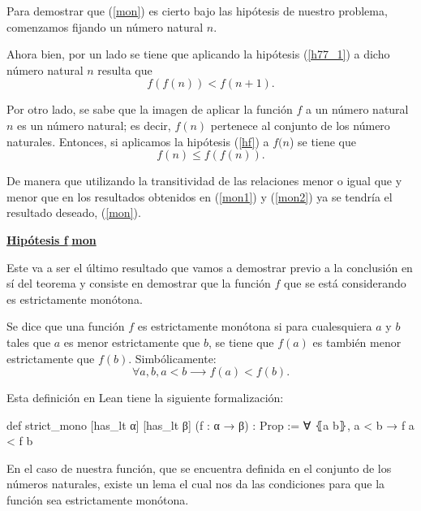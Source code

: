 \begin{demostracion}
  Para demostrar que (\ref{mon}) es cierto bajo las hipótesis de nuestro
  problema, comenzamos fijando un número natural \(n\).

  Ahora bien, por un lado se tiene que aplicando la hipótesis
  (\ref{h77_1}) a dicho número natural \(n\) resulta que
  \begin{equation}\label{mon1}
    f(f(n)) < f(n+1).
  \end{equation}

  Por otro lado, se sabe que la imagen de aplicar la función \(f\) a un
  número natural \(n\) es un número natural; es decir, \(f(n)\)
  pertenece al conjunto de los número naturales. Entonces, si aplicamos
  la hipótesis (\ref{hf}) a \(f(n\)) se tiene que
  \begin{equation}\label{mon2}
    f(n) ≤ f(f(n)).
  \end{equation}

  De manera que utilizando la transitividad de las relaciones menor o
  igual que y menor que en los resultados obtenidos en (\ref{mon1}) y
  (\ref{mon2}) ya se tendría el resultado deseado, (\ref{mon}).

  \noindent
  \textbf{\underline{Hipótesis f\(\_\)mon}}

  Este va a ser el último resultado que vamos a demostrar previo a la
  conclusión en sí del teorema y consiste en demostrar que la función
  \(f\) que se está considerando es estrictamente monótona.

  \begin{definicion}\label{def:mono}
    Se dice que una función \(f\) es estrictamente monótona si para
    cualesquiera \(a\) y \(b\) tales que \(a\) es menor estrictamente
    que \(b\), se tiene que \(f(a)\) es también menor estrictamente que
    \(f(b)\). Simbólicamente:
    \begin{equation}
      ∀a,b, a < b ⟶ f(a) < f(b).
    \end{equation}
  \end{definicion}

  Esta definición en Lean tiene la siguiente formalización:
  \begin{leancode}
    def strict_mono [has_lt α] [has_lt β] (f : α → β) : Prop :=
    ∀ ⦃a b⦄, a < b → f a < f b
  \end{leancode}

  En el caso de nuestra función, que se encuentra definida en el
  conjunto de los números naturales, existe un lema el cual nos da las
  condiciones para que la función sea estrictamente monótona.


\end{demostracion}
